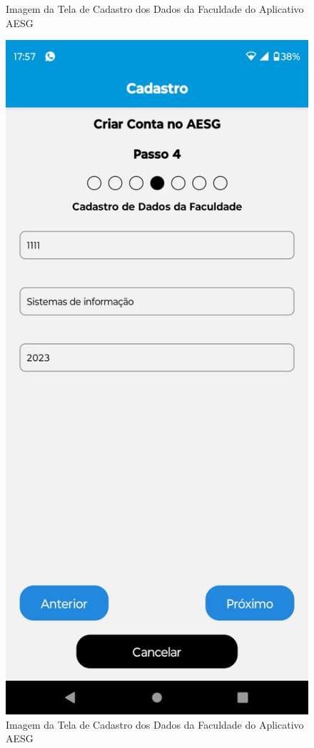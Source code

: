 \documentclass[
    12pt,                   %
    openright,              %
    oneside,                %
    a4paper,                %
    sumario=tradicional,    %
    english,                %
    brazil,                 %
    ]{abntex2}
\begin{document}
\begin{figure}[!h]
\begin{minipage}{0.5\textwidth}
                    \caption[Imagem da Tela de Cadastro dos Dados da Faculdade do Aplicativo AESG]{ 
                    Imagem da Tela de Cadastro dos Dados da Faculdade do Aplicativo AESG}
                    \label{fig:AppTelaCadastro13}
                \end{minipage}%
                \begin{minipage}{0.5\textwidth}
                    \centering
                    \includegraphics[width=0.8\linewidth]{Imagens/App Images User/AUCadastro4.png}
                    \caption[Imagem da Tela de Cadastro dos Dados da Faculdade Preenchido do Aplicativo AESG]{ 
                    Imagem da Tela de Cadastro dos Dados da Faculdade do Aplicativo AESG}
                    \label{fig:AppTelaCadastro4}
                \end{minipage}
            \end{figure}
\end{document}
